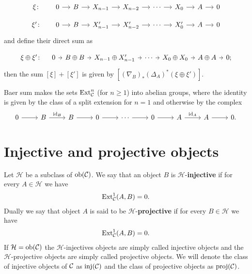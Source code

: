 \[\begin{tikzcd}[sep=small]
	{\xi \colon} & 0 & B & {X_{n-1}} & {X_{n-2}} & \cdots & {X_0} & A & 0 \\
	{\xi' \colon} & 0 & B & {X'_{n-1}} & {X'_{n-2}} & \cdots & {X'_0} & A & 0
	\arrow[from=1-2, to=1-3]
	\arrow[from=1-3, to=1-4]
	\arrow[from=1-4, to=1-5]
	\arrow[from=1-5, to=1-6]
	\arrow[from=1-6, to=1-7]
	\arrow[from=1-7, to=1-8]
	\arrow[from=1-8, to=1-9]
	\arrow[from=2-2, to=2-3]
	\arrow[from=2-3, to=2-4]
	\arrow[from=2-4, to=2-5]
	\arrow[from=2-5, to=2-6]
	\arrow[from=2-6, to=2-7]
	\arrow[from=2-7, to=2-8]
	\arrow[from=2-8, to=2-9]
\end{tikzcd}\]
and define their direct sum as 

\[\begin{tikzcd}[sep=tiny]
	{\xi \oplus \xi'\colon} & 0 & {B\oplus B} & {X_{n-1} \oplus X'_{n-1}} & \cdots & {X_0\oplus X_0} & {A \oplus A} & {0;}
	\arrow[from=1-2, to=1-3]
	\arrow[from=1-3, to=1-4]
	\arrow[from=1-4, to=1-5]
	\arrow[from=1-5, to=1-6]
	\arrow[from=1-6, to=1-7]
	\arrow[from=1-7, to=1-8]
\end{tikzcd}\]
then the sum $[\xi] + [\xi']$ is given by $[\left( \nabla_B \right)_* \left( \Delta_A \right)^* (\xi \oplus \xi')] $.

\begin{theorem}
	Baer sum makes the sets $\mathrm{Ext}^n_{\mathcal{C}}$ (for $n\geq 1$) into abelian groups, where the identity is given by the class of a split extension for $n=1$ and otherwise by the complex
	\[\begin{tikzcd}
		0 & B & B & 0 & \cdots & 0 & A & A & {0.}
		\arrow[from=1-1, to=1-2]
		\arrow["{\id_B}", from=1-2, to=1-3]
		\arrow[from=1-3, to=1-4]
		\arrow[from=1-4, to=1-5]
		\arrow[from=1-5, to=1-6]
		\arrow[from=1-6, to=1-7]
		\arrow["{\id_A}", from=1-7, to=1-8]
		\arrow[from=1-8, to=1-9]
	\end{tikzcd}\]
\end{theorem}









\section{Injective and projective objects}

\begin{definition}
	\label{def:inj-proj}
	Let $\mathcal{H}$ be a subclass of $\mathrm{ob}(\mathcal{C})$. We say that an object $B$ is $\mathcal{H}$-\textbf{injective} if for every $A\in \mathcal{H}$ we have
	\[\mathrm{Ext}^1_{\mathcal{C}}(A,B) = 0.\]
	Dually we say that object $A$ is said to be $\mathcal{H}$-\textbf{projective} if for every $B\in \mathcal{H}$ we have
	\[\mathrm{Ext}^1_{\mathcal{C}}(A,B) = 0.\]
	If $\mathcal{H}= \mathrm{ob}(\mathcal{C})$ the $\mathcal{H}$-injectives objects are simply called injective objects and the $\mathcal{H}$-projective objects are simply called projective objects. We will denote the class of injective objects of $\mathcal{C}$ as $\mathrm{inj}(\mathcal{C})$ and the class of projective objects as $\mathrm{proj}(\mathcal{C})$.
\end{definition}


